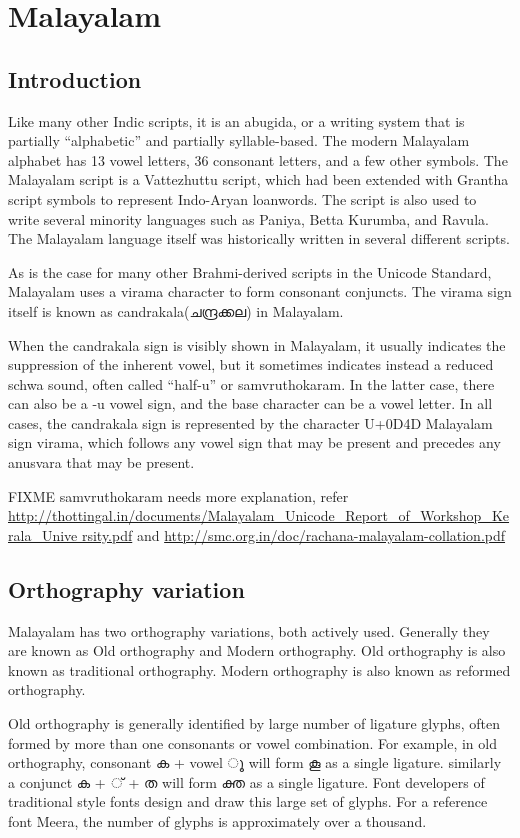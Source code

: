 \chapter{Malayalam}
\section{Introduction}

Like many other Indic scripts, it is an abugida, or a writing system
that is partially “alphabetic” and partially syllable-based. The
modern Malayalam alphabet has 13 vowel letters, 36 consonant letters,
and a few other symbols. The Malayalam script is a Vattezhuttu script,
which had been extended with Grantha script symbols to represent
Indo-Aryan loanwords. The script is also used to write several
minority languages such as Paniya, Betta Kurumba, and Ravula. The
Malayalam language itself was historically written in several
different scripts.

As is the case for many other Brahmi-derived scripts in the Unicode
Standard, Malayalam uses a virama character to form consonant
conjuncts. The virama sign itself is known as candrakala({\meera ചന്ദ്രക്കല}) in
Malayalam.

When the candrakala sign is visibly shown in Malayalam, it usually
indicates the suppression of the inherent vowel, but it sometimes
indicates instead a reduced schwa sound, often called “half-u” or
samvruthokaram. In the latter case, there can also be a -u vowel sign,
and the base character can be a vowel letter. In all cases, the
candrakala sign is represented by the character U+0D4D Malayalam sign
virama, which follows any vowel sign that may be present and precedes
any anusvara that may be present.

FIXME samvruthokaram needs more explanation, refer
{\url{
http://thottingal.in/documents/Malayalam_Unicode_Report_of_Workshop_Kerala_Unive
rsity.pdf}}
and {\url{http://smc.org.in/doc/rachana-malayalam-collation.pdf}}

\section{Orthography variation}

Malayalam has two orthography variations, both actively
used. Generally they are known as Old orthography and Modern
orthography. Old orthography is also known as traditional
orthography. Modern orthography is also known as reformed orthography.

Old orthography is generally identified by large number of ligature
glyphs, often formed by more than one consonants or vowel
combination. For example, in old orthography, consonant {\meera ക} +
vowel { \meera ൂ} will form {\meera കൂ} as a single ligature. similarly a
conjunct {\meera ക + ് + ത} will form {\meera ക്ത} as a single
ligature. Font developers of traditional style fonts design and draw
this large set of glyphs. For a reference font Meera, the number of
glyphs is approximately over a thousand.

